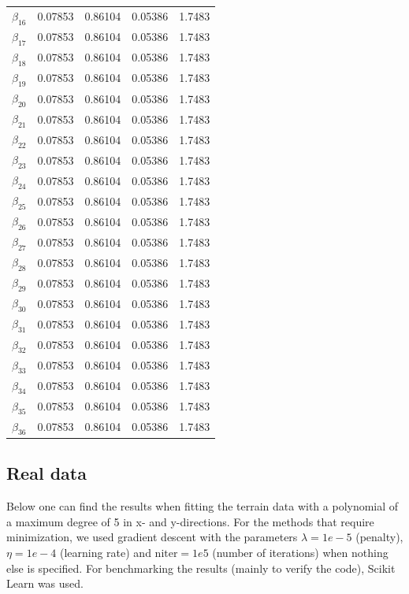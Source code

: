 \begin{table} [H]
\begin{tabularx}{\textwidth}{l|XXXX}
		$\beta_{16}$ & 0.07853 & 0.86104 & 0.05386 & 1.7483\\
		$\beta_{17}$ & 0.07853 & 0.86104 & 0.05386 & 1.7483\\
		$\beta_{18}$ & 0.07853 & 0.86104 & 0.05386 & 1.7483\\
		$\beta_{19}$ & 0.07853 & 0.86104 & 0.05386 & 1.7483\\
		$\beta_{20}$ & 0.07853 & 0.86104 & 0.05386 & 1.7483\\
		$\beta_{21}$ & 0.07853 & 0.86104 & 0.05386 & 1.7483\\
		$\beta_{22}$ & 0.07853 & 0.86104 & 0.05386 & 1.7483\\
		$\beta_{23}$ & 0.07853 & 0.86104 & 0.05386 & 1.7483\\
		$\beta_{24}$ & 0.07853 & 0.86104 & 0.05386 & 1.7483\\
		$\beta_{25}$ & 0.07853 & 0.86104 & 0.05386 & 1.7483\\
		$\beta_{26}$ & 0.07853 & 0.86104 & 0.05386 & 1.7483\\
		$\beta_{27}$ & 0.07853 & 0.86104 & 0.05386 & 1.7483\\
		$\beta_{28}$ & 0.07853 & 0.86104 & 0.05386 & 1.7483\\
		$\beta_{29}$ & 0.07853 & 0.86104 & 0.05386 & 1.7483\\
		$\beta_{30}$ & 0.07853 & 0.86104 & 0.05386 & 1.7483\\
		$\beta_{31}$ & 0.07853 & 0.86104 & 0.05386 & 1.7483\\
		$\beta_{32}$ & 0.07853 & 0.86104 & 0.05386 & 1.7483\\
		$\beta_{33}$ & 0.07853 & 0.86104 & 0.05386 & 1.7483\\
		$\beta_{34}$ & 0.07853 & 0.86104 & 0.05386 & 1.7483\\
		$\beta_{35}$ & 0.07853 & 0.86104 & 0.05386 & 1.7483\\
		$\beta_{36}$ & 0.07853 & 0.86104 & 0.05386 & 1.7483\\ \hline
	\end{tabularx}
\end{table}
\fi

\subsection{Real data}
Below one can find the results when fitting the terrain data with a polynomial of a maximum degree of 5 in x- and y-directions. For the methods that require minimization, we used gradient descent with the parameters $\lambda=1e-5$ (penalty), $\eta=1e-4$ (learning rate) and $\text{niter}=1e5$ (number of iterations) when nothing else is specified. For benchmarking the results (mainly to verify the code), Scikit Learn was used.

